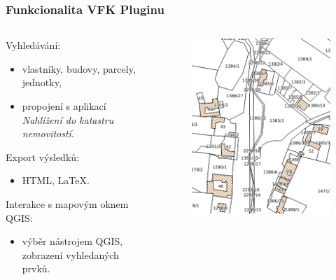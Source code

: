 \documentclass{beamer}
\begin{document}

\begin{frame}
\frametitle{Funkcionalita VFK Pluginu}

\begin{columns}%

  \begin{column}{0.6\textwidth}
    Vyhledávání:
    \begin{itemize}
    \item vlastníky, budovy, parcely, jednotky,
    \item propojení s aplikací \textit{Nahlížení do katastru nemovitostí}.
    \end{itemize}

    Export výsledků:
    \begin{itemize}
    \item HTML, \LaTeX.
    \end{itemize}

    Interakce s mapovým oknem QGIS:
    \begin{itemize}
    \item výběr nástrojem QGIS, zobrazení vyhledaných prvků.
    \end{itemize}   
    
  \end{column}
  
  \begin{column}{0.4\textwidth}
    \begin{figure}
      \includegraphics[width=1\textwidth]{images/vfkPlugin-nactena_data.png}
    \end{figure}
  \end{column}


\end{columns}
\end{frame}
\end{document}
